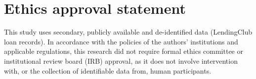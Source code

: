 \documentclass[a4paper,fleqn]{cas-dc}
\begin{document}
\section*{Ethics approval statement}
This study uses secondary, publicly available and de-identified data (LendingClub loan records). In accordance with the policies of the authors’ institutions and applicable regulations, this research did not require formal ethics committee or institutional review board (IRB) approval, as it does not involve intervention with, or the collection of identifiable data from, human participants.


%







\end{document}
